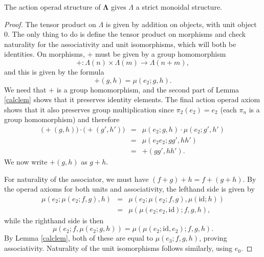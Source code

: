 \documentclass{amsbook} %
\newcommand{\ML}{\mathbf{\Lambda}}
\numberwithin{section}{chapter}
\begin{document}
\begin{prop}\label{Gmonoidal}
The action operad structure of $\ML$ gives $\mathbb{\Lambda}$ a strict monoidal structure.
\end{prop}
\begin{proof}
The tensor product on $\mathbb{\Lambda}$ is given by addition on objects, with unit object 0.  The only thing to do is define the tensor product on morphisms and check naturality for the associativity and unit isomorphisms, which will both be identities.  On morphisms, $+$ must be given by a group homomorphism
\[
+ \colon \Lambda(n) \times \Lambda(m) \rightarrow \Lambda(n+m),
\]
 and this is given by the formula
\[
+(g,h) = \mu(e_{2}; g,h).
\]
We need that $+$ is a group homomorphism, and the second part of Lemma \ref{calclem} shows that it preserves identity elements.  The final action operad axiom shows that it also preserves group multiplication since $\pi_{2}(e_{2}) = e_{2}$ (each $\pi_{n}$ is a group homomorphism) and therefore
\[
\begin{array}{rcl}
\Big(+(g,h)\Big) \cdot \Big(+(g',h')\Big) & = & \mu(e_{2}; g,h) \cdot \mu(e_{2}; g',h') \\
 & = & \mu(e_{2}e_{2}; gg', hh') \\
& = & +(gg',hh').
\end{array}
\]
We now write $+(g,h)$ as $g+h$.

For naturality of the associator, we must have $(f+g)+h = f+(g+h)$.  By the operad axioms for both units and associativity, the lefthand side is given by
\[
\begin{array}{rcl}
\mu(e_{2}; \mu(e_{2}; f,g), h) & = & \mu(e_{2}; \mu(e_{2}; f,g), \mu(\textrm{id};h)) \\
& = & \mu(\mu(e_{2}; e_{2}, \textrm{id}); f,g,h),
\end{array}
\]
while the righthand side is then
\[
\mu(e_{2}; f, \mu(e_{2}; g,h)) = \mu(\mu(e_{2}; \textrm{id}, e_{2}); f,g,h).
\]
By Lemma \ref{calclem}, both of these are equal to $\mu(e_{3}; f,g,h)$, proving associativity.  Naturality of the unit isomorphisms follows similarly, using $e_{0}$.
\end{proof}
\end{document}
